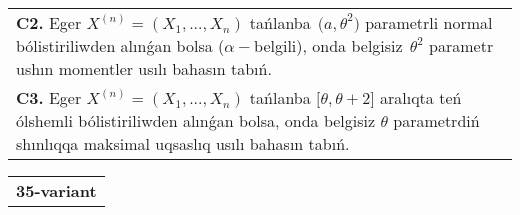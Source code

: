 \documentclass{article}
\begin{document}
\begin{tabular}{m{17cm}}
 \\
\textbf{C2.} 
Eger \(X^{(n)} = \left( X_{1},...,X_{n} \right)\) tańlanba\({\ \ (a,\theta}^{2})\) parametrli normal bólistiriliwden alınǵan bolsa (\(\alpha -\)belgili), onda belgisiz\({\ \ \theta}^{2}\) parametr ushın momentler usılı bahasın tabıń.
 \\
\textbf{C3.} 
Eger \(X^{(n)} = \left( X_{1},...,X_{n} \right)\) tańlanba \(\lbrack\theta,\theta + 2\rbrack\) aralıqta teń ólshemli bólistiriliwden alınǵan bolsa, onda belgisiz \(\theta\) parametrdiń shınlıqqa maksimal uqsaslıq usılı bahasın tabıń.
 \\

\end{tabular}
\vspace{1cm}


\begin{tabular}{m{17cm}}
\textbf{35-variant}
\newline


\end{tabular}
\end{document}
